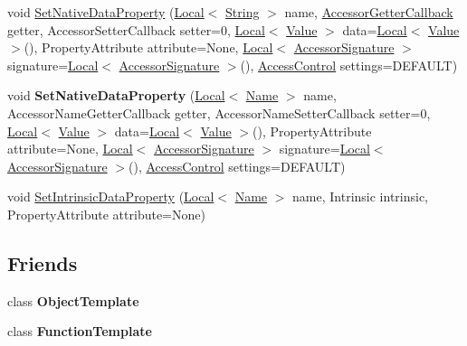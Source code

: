 \begin{DoxyCompactItemize}
\item 
void \hyperlink{classv8_1_1Template_ae23966bef9b32df6ced859a39b4a1f19}{Set\+Native\+Data\+Property} (\hyperlink{classv8_1_1Local}{Local}$<$ \hyperlink{classv8_1_1String}{String} $>$ name, \hyperlink{namespacev8_a722613c87061708a4f1aa050d095f868}{Accessor\+Getter\+Callback} getter, Accessor\+Setter\+Callback setter=0, \hyperlink{classv8_1_1Local}{Local}$<$ \hyperlink{classv8_1_1Value}{Value} $>$ data=\hyperlink{classv8_1_1Local}{Local}$<$ \hyperlink{classv8_1_1Value}{Value} $>$(), Property\+Attribute attribute=None, \hyperlink{classv8_1_1Local}{Local}$<$ \hyperlink{classv8_1_1AccessorSignature}{Accessor\+Signature} $>$ signature=\hyperlink{classv8_1_1Local}{Local}$<$ \hyperlink{classv8_1_1AccessorSignature}{Accessor\+Signature} $>$(), \hyperlink{namespacev8_a31d8355cb043d7d2dda3f4a52760b64e}{Access\+Control} settings=D\+E\+F\+A\+U\+LT)
\item 
void {\bfseries Set\+Native\+Data\+Property} (\hyperlink{classv8_1_1Local}{Local}$<$ \hyperlink{classv8_1_1Name}{Name} $>$ name, Accessor\+Name\+Getter\+Callback getter, Accessor\+Name\+Setter\+Callback setter=0, \hyperlink{classv8_1_1Local}{Local}$<$ \hyperlink{classv8_1_1Value}{Value} $>$ data=\hyperlink{classv8_1_1Local}{Local}$<$ \hyperlink{classv8_1_1Value}{Value} $>$(), Property\+Attribute attribute=None, \hyperlink{classv8_1_1Local}{Local}$<$ \hyperlink{classv8_1_1AccessorSignature}{Accessor\+Signature} $>$ signature=\hyperlink{classv8_1_1Local}{Local}$<$ \hyperlink{classv8_1_1AccessorSignature}{Accessor\+Signature} $>$(), \hyperlink{namespacev8_a31d8355cb043d7d2dda3f4a52760b64e}{Access\+Control} settings=D\+E\+F\+A\+U\+LT)\hypertarget{classv8_1_1Template_a9aebe244ed9f88d7653bfbecb4e62026}{}\label{classv8_1_1Template_a9aebe244ed9f88d7653bfbecb4e62026}

\item 
void \hyperlink{classv8_1_1Template_aef172ef714818a210d815de389a5ab77}{Set\+Intrinsic\+Data\+Property} (\hyperlink{classv8_1_1Local}{Local}$<$ \hyperlink{classv8_1_1Name}{Name} $>$ name, Intrinsic intrinsic, Property\+Attribute attribute=None)
\end{DoxyCompactItemize}
\subsection*{Friends}
\begin{DoxyCompactItemize}
\item 
class {\bfseries Object\+Template}\hypertarget{classv8_1_1Template_a4d28646409234f556983be8a96c06424}{}\label{classv8_1_1Template_a4d28646409234f556983be8a96c06424}

\item 
class {\bfseries Function\+Template}\hypertarget{classv8_1_1Template_a334168ad1a5f39cf17b818ca3356aacd}{}\label{classv8_1_1Template_a334168ad1a5f39cf17b818ca3356aacd}

\end{DoxyCompactItemize}


